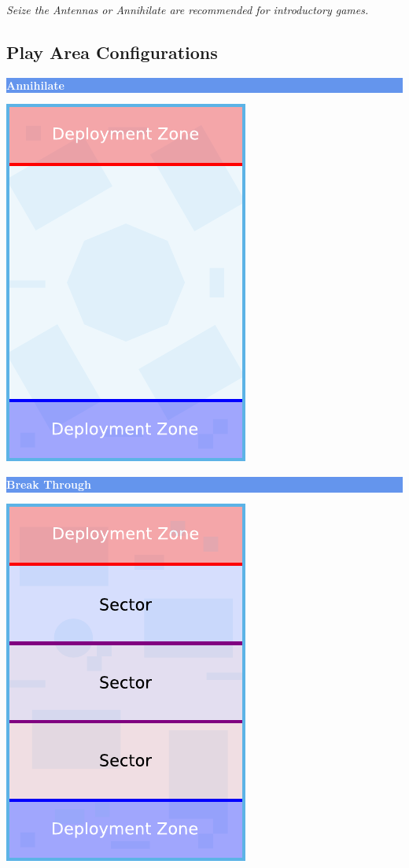 \documentclass[14pt,dvipsnames]{extarticle}
\begin{document}
\medskip
\centerline{\textit{Seize the Antennas or Annihilate are recommended for introductory games.}}

\subsection{Play Area Configurations}

\hfill
\begin{minipage}{2in}\centering
\colorbox{CornflowerBlue}{\parbox[t][12pt]{\linewidth-2\fboxsep}{\centering\textcolor{White}{\textbf{Annihilate}}}}

\smallskip
\includegraphics[scale=0.9]{maps/map-annihilate}
\end{minipage}
\hfill
\begin{minipage}{2in}\centering
\colorbox{CornflowerBlue}{\parbox[t][12pt]{\linewidth}{\centering\textcolor{White}{\textbf{Break Through}}}}

\smallskip
\includegraphics[scale=0.9]{maps/map-breakthrough}
\end{minipage}
\end{document}
